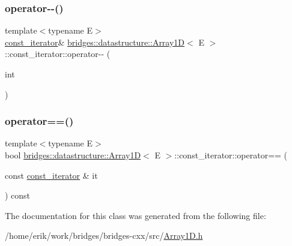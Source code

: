 \subsubsection{\texorpdfstring{operator-\/-\/()}{operator--()}\hspace{0.1cm}{\footnotesize\ttfamily [2/2]}}
{\footnotesize\ttfamily template$<$typename E$>$ \\
\hyperlink{classbridges_1_1datastructure_1_1_array1_d_1_1const__iterator}{const\+\_\+iterator}\& \hyperlink{classbridges_1_1datastructure_1_1_array1_d}{bridges\+::datastructure\+::\+Array1D}$<$ E $>$\+::const\+\_\+iterator\+::operator-\/-\/ (\begin{DoxyParamCaption}\item[{int}]{ }\end{DoxyParamCaption})\hspace{0.3cm}{\ttfamily [inline]}}

\mbox{\label{classbridges_1_1datastructure_1_1_array1_d_1_1const__iterator_a004eca869afdc913a1d1a448bb4b7871}} 
\subsubsection{\texorpdfstring{operator==()}{operator==()}}
{\footnotesize\ttfamily template$<$typename E$>$ \\
bool \hyperlink{classbridges_1_1datastructure_1_1_array1_d}{bridges\+::datastructure\+::\+Array1D}$<$ E $>$\+::const\+\_\+iterator\+::operator== (\begin{DoxyParamCaption}\item[{const \hyperlink{classbridges_1_1datastructure_1_1_array1_d_1_1const__iterator}{const\+\_\+iterator} \&}]{it }\end{DoxyParamCaption}) const\hspace{0.3cm}{\ttfamily [inline]}}



The documentation for this class was generated from the following file\+:\begin{DoxyCompactItemize}
\item 
/home/erik/work/bridges/bridges-\/cxx/src/\hyperlink{_array1_d_8h}{Array1\+D.\+h}\end{DoxyCompactItemize}
